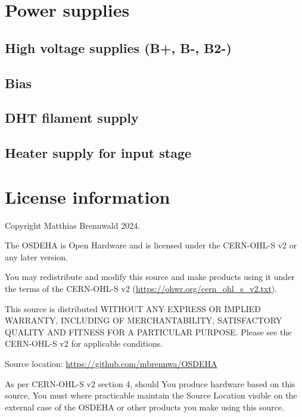 \section{Power supplies}

\subsection{High voltage supplies (B+, B-, B2-)}

\subsection{Bias}

\subsection{DHT filament supply}

\subsection{Heater supply for input stage}


\section{License information} 
Copyright Matthias Brennwald 2024.                                                    

The OSDEHA is Open Hardware and is licensed under the CERN-OHL-S v2 or any later version.

You may redistribute and modify this source and make products using it under the terms of the CERN-OHL-S v2 (\url{https://ohwr.org/cern_ohl_s_v2.txt}).

This source is distributed WITHOUT ANY EXPRESS OR IMPLIED WARRANTY, INCLUDING OF MERCHANTABILITY, SATISFACTORY QUALITY AND FITNESS FOR A PARTICULAR PURPOSE. Please see the CERN-OHL-S v2 for applicable conditions.

Source location: \url{https://github.com/mbrennwa/OSDEHA}

As per CERN-OHL-S v2 section 4, should You produce hardware based on this source, You must where practicable maintain the Source Location visible on the external case of the OSDEHA or other products you make using this source.            







